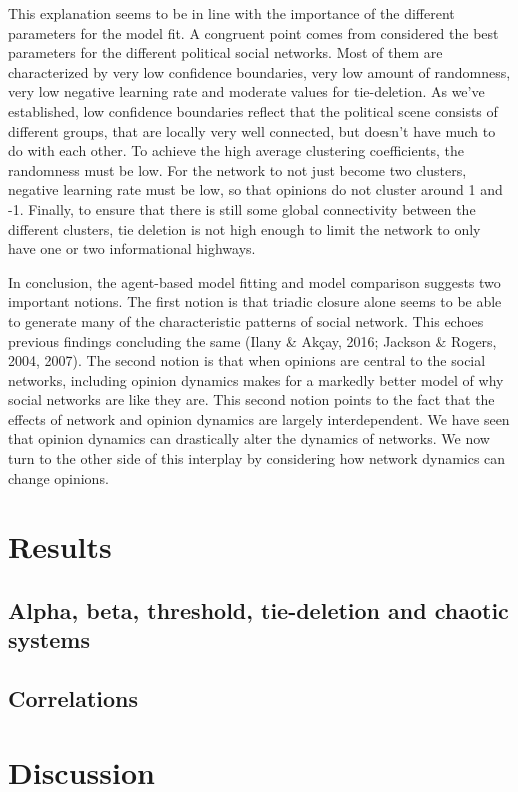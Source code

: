 \documentclass{article}
\begin{document}
This explanation seems to be in line with the importance of the different parameters for the model fit. A congruent point comes from considered the best parameters for the different political social networks. Most of them are characterized by very low confidence boundaries, very low amount of randomness, very low negative learning rate and moderate values for tie-deletion. As we’ve established, low confidence boundaries reflect that the political scene consists of different groups, that are locally very well connected, but doesn’t have much to do with each other. To achieve the high average clustering coefficients, the randomness must be low. For the network to not just become two clusters, negative learning rate must be low, so that opinions do not cluster around 1 and -1. Finally, to ensure that there is still some global connectivity between the different clusters, tie deletion is not high enough to limit the network to only have one or two informational highways. 

In conclusion, the agent-based model fitting and model comparison suggests two important notions. The first notion is that triadic closure alone seems to be able to generate many of the characteristic patterns of social network. This echoes previous findings concluding the same (Ilany \& Akçay, 2016; Jackson \& Rogers, 2004, 2007). The second notion is that when opinions are central to the social networks, including opinion dynamics makes for a markedly better model of why social networks are like they are. 
This second notion points to the fact that the effects of network and opinion dynamics are largely interdependent. We have seen that opinion dynamics can drastically alter the dynamics of networks. We now turn to the other side of this interplay by considering how network dynamics can change opinions.

\section{Results}

\subsection{Alpha, beta, threshold, tie-deletion and chaotic systems}

\subsection{Correlations}

\section{Discussion}
\end{document}
